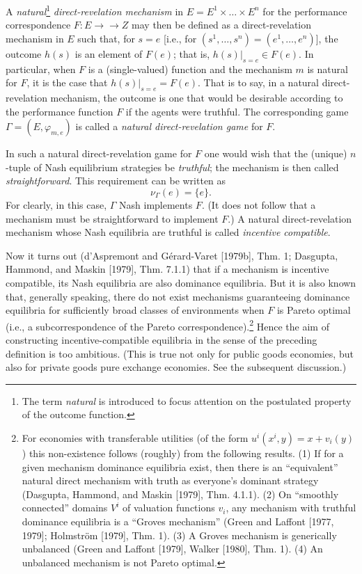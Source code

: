 \documentclass[12pt, letterpaper]{article}
\begin{document}
A \textit{natural}\footnote{The term \textit{natural} is introduced to focus attention on the postulated property of the outcome function.} \textit{direct-revelation mechanism} in $E = E^1 \times \dots \times E^n$ for the performance correspondence $F \colon E \to\to Z$ may then be defined as a direct-revelation mechanism in $E$ such that, for $s = e$ [i.e., for $(s^1, \dots, s^n) = (e^1, \dots, e^n)$], the outcome $h(s)$ is an element of $F(e)$; that is, $h(s)|_{s=e} \in F(e)$. In particular, when $F$ is a (single-valued) function and the mechanism $m$ is natural for $F$, it is the case that $h(s)|_{s=e} = F(e)$. That is to say, in a natural direct-revelation mechanism, the outcome is one that would be desirable according to the performance function $F$ if the agents were truthful. The corresponding game $\Gamma = (E, \varphi_{m,e})$ is called a \textit{natural direct-revelation game} for $F$.

In such a natural direct-revelation game for $F$ one would wish that the (unique) $n$-tuple of Nash equilibrium strategies be \textit{truthful}; the mechanism is then called \textit{straightforward}. This requirement can be written as
\[
\nu_\Gamma(e) = \{e\}.
\]
For clearly, in this case, $\Gamma$ Nash implements $F$. (It does not follow that a mechanism must be straightforward to implement $F$.) A natural direct-revelation mechanism whose Nash equilibria are truthful is called \textit{incentive compatible}.

Now it turns out (d'Aspremont and Gérard-Varet [1979b], Thm. 1; Dasgupta, Hammond, and Maskin [1979], Thm. 7.1.1) that if a mechanism is incentive compatible, its Nash equilibria are also dominance equilibria. But it is also known that, generally speaking, there do not exist mechanisms guaranteeing dominance equilibria for sufficiently broad classes of environments when $F$ is Pareto optimal (i.e., a subcorrespondence of the Pareto correspondence).\footnote{For economies with transferable utilities (of the form $u^i(x^i, y) = x + v_i(y)$) this non-existence follows (roughly) from the following results. (1) If for a given mechanism dominance equilibria exist, then there is an ``equivalent'' natural direct mechanism with truth as everyone's dominant strategy (Dasgupta, Hammond, and Maskin [1979], Thm. 4.1.1). (2) On ``smoothly connected'' domains $V^i$ of valuation functions $v_i$, any mechanism with truthful dominance equilibria is a ``Groves mechanism'' (Green and Laffont [1977, 1979]; Holmström [1979], Thm. 1). (3) A Groves mechanism is generically unbalanced (Green and Laffont [1979], Walker [1980], Thm. 1). (4) An unbalanced mechanism is not Pareto optimal.} Hence the aim of constructing incentive-compatible equilibria in the sense of the preceding definition is too ambitious. (This is true not only for public goods economies, but also for private goods pure exchange economies. See the subsequent discussion.)
\end{document}
